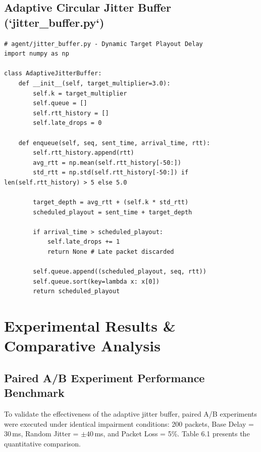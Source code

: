 \documentclass[12pt, a4paper]{report}
\begin{document}
\section{Adaptive Circular Jitter Buffer (`jitter\_buffer.py`)}
\begin{verbatim}
# agent/jitter_buffer.py - Dynamic Target Playout Delay
import numpy as np

class AdaptiveJitterBuffer:
    def __init__(self, target_multiplier=3.0):
        self.k = target_multiplier
        self.queue = []
        self.rtt_history = []
        self.late_drops = 0
        
    def enqueue(self, seq, sent_time, arrival_time, rtt):
        self.rtt_history.append(rtt)
        avg_rtt = np.mean(self.rtt_history[-50:])
        std_rtt = np.std(self.rtt_history[-50:]) if len(self.rtt_history) > 5 else 5.0
        
        target_depth = avg_rtt + (self.k * std_rtt)
        scheduled_playout = sent_time + target_depth
        
        if arrival_time > scheduled_playout:
            self.late_drops += 1
            return None # Late packet discarded
            
        self.queue.append((scheduled_playout, seq, rtt))
        self.queue.sort(key=lambda x: x[0])
        return scheduled_playout
\end{verbatim}

\newpage
\chapter{Experimental Results \& Comparative Analysis}

\section{Paired A/B Experiment Performance Benchmark}
To validate the effectiveness of the adaptive jitter buffer, paired A/B experiments were executed under identical impairment conditions: 200 packets, Base Delay = 30\,ms, Random Jitter = $\pm 40$\,ms, and Packet Loss = 5\%. Table 6.1 presents the quantitative comparison.
\end{document}
